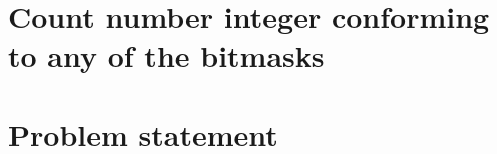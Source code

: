 %



\section{Count number integer conforming to any of the bitmasks}
\label{ch:count_numbers_conforming_bitmask}

\section{Problem statement}
